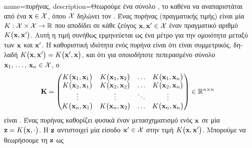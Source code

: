 {name={\foreignlanguage{greek}{πυρήνας}}, 
	description={\foreignlanguage{greek}{Θεωρούμε ένα σύνολο} , 
		\foreignlanguage{greek}{το καθένα να αναπαριστάται από ένα}  ${\bf x} \in \mathcal{X}$, 
		\foreignlanguage{greek}{όπου $\mathcal{X}$ δηλώνει τον} . \foreignlanguage{greek}{Ένας πυρήνας 
		(πραγματικής τιμής) είναι μία}  $K: \mathcal{X} \times \mathcal{X} \rightarrow \mathbb{R}$ 
		\foreignlanguage{greek}{που αποδίδει σε κάθε ζεύγος}  ${\bf x}, {\bf x}' \in \mathcal{X}$ 
		\foreignlanguage{greek}{έναν πραγματικό αριθμό $K\big({\bf x},{\bf x}'\big)$. Αυτή η τιμή συνήθως ερμηνεύεται 
     		ως ένα μέτρο για την ομοιότητα μεταξύ των ${\bf x}$ και ${\bf x}'$. Η καθοριστική ιδιότητα ενός πυρήνα είναι ότι είναι
		συμμετρικός, δηλαδή $K\big({\bf x},{\bf x}'\big) = K\big({\bf x}',{\bf x}\big)$, και ότι για οποιοδήποτε πεπερασμένο 
		σύνολο}  ${\bf x}_1, \,\ldots, \,{\bf x}_n \in \mathcal{X}$, \foreignlanguage{greek}{ο}  
	  	\begin{equation}
	 		\nonumber
	 		\mathbf{K} = \begin{pmatrix}
	 			K\big({\bf x}_1,{\bf x}_1\big) & K\big({\bf x}_1,{\bf x}_2\big) & \ldots & K\big({\bf x}_1,{\bf x}_n\big) \\
	 			K\big({\bf x}_2,{\bf x}_1\big) & K\big({\bf x}_2,{\bf x}_2\big) & \ldots & K\big({\bf x}_2,{\bf x}_n\big) \\
	 			\vdots											
	 			& \vdots & \ddots & \vdots \\
	 			K\big({\bf x}_n,{\bf x}_1\big) & K\big({\bf x}_n,{\bf x}_2\big) & \ldots & K\big({\bf x}_n,{\bf x}_n\big) 
	 		\end{pmatrix} \in \mathbb{R}^{n \times n}
	 	\end{equation}
	 	\foreignlanguage{greek}{είναι} . \foreignlanguage{greek}{Ένας πυρήνας καθορίζει φυσικά έναν μετασχηματισμό ενός} 
		 ${\bf x}$ \foreignlanguage{greek}{σε μία}  ${\bf z} = K\big({\bf x},\cdot\big)$. 
		\foreignlanguage{greek}{Η}  ${\bf z}$ \foreignlanguage{greek}{αντιστοιχεί μία είσοδο ${\bf x}' \in \mathcal{X}$ 
		στην τιμή $K\big({\bf x},{\bf x}'\big)$. Μπορούμε να θεωρήσουμε τη}  ${\bf z}$ \foreignlanguage{greek}{ως 
}}}
